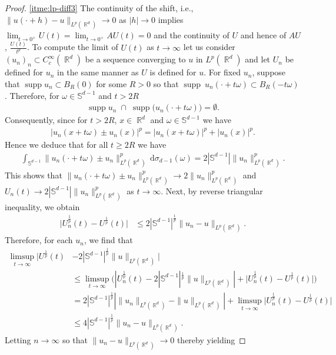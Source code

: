 \documentclass[12pt, reqno]{amsart}%
\theoremstyle{plain}  %
\theoremstyle{definition}  %
\theoremstyle{remark}
\numberwithin{equation}{section}
\DeclareMathOperator{\supp}{supp}
\DeclareMathOperator{\R}{\mathbb{R}}
\renewcommand{\d}{\,\mathrm{d}}
\begin{document}
\begin{proof}
\eqref{itme:lp-diff3} The continuity of the shift, i.e.,  $\|u(\cdot+h)-u\|_{L^p(\R^d)}\to 0$ as $|h|\to0$ implies $\lim_{t \to 0^+} U(t)= \lim_{t \to 0^+} AU(t)=0$ and the continuity of $U$  and hence of $AU$, $\frac{U(t)}{t^p}$. To compute the limit of $U(t)$ as $t\to\infty$ let us consider $(u_n)_n\subset C_c^\infty(\R^d)$  be a sequence converging to $u$ in $L^p(\R^d)$ and let  $U_n$ be defined for $u_n$ in the same manner as $U$ is defined for $u$. For fixed $u_n$, suppose that $\supp u_n \subset B_R(0)$ for some $R>0$ so that $\supp ~u_n(\cdot+t\omega)  \subset B_R(-t\omega)$.
Therefore,  for $\omega \in \mathbb{S}^{d-1}$ and $t>2R$
\begin{align*}
\supp u_n \;\cap\; \supp\big(u_n(\cdot+t\omega)\big) = \emptyset.
\end{align*}
Consequently, since for $t>2R$, $x\in\R^d$  and $\omega\in \mathbb{S}^{d-1}$ we have
\begin{align*}
|u_n(x+t\omega)\pm u_n(x)|^p = |u_n(x+t\omega)|^p + |u_n(x)|^p.
\end{align*}
Hence we deduce that for all $t\geq 2R$ we have
\begin{align*}
\int_{\mathbb{S}^{d-1}}\|u_n(\cdot+t\omega)\pm u_n\|^p_{L^p(\R^d)}\d\sigma_{d-1}(\omega)
= 2|\mathbb{S}^{d-1}| \|u_n\|^p_{L^p(\R^d)}.
\end{align*}
This  shows that  $\|u_n(\cdot+ t\omega)\pm u_n\|^p_{L^p(\R^d)}\to 2\|u_n\|^p_{L^p(\R^d)}$  and $U_n(t)\to 2|\mathbb{S}^{d-1}|\|u_n\|^p_{L^p(\R^d)}$ as $t\to \infty$. Next, by reverse triangular inequality, we obtain
\begin{align*}
\big|U^{\frac{1}{p}}_n(t)-U^{\frac{1}{p}}(t)\big|&\leq 2|\mathbb{S}^{d-1}|^{\frac{1}{p}}\| u_n-u\|_{L^p(\R^d)}.
\end{align*}
Therefore, for each  $u_n$, we find that
\begin{align*}
\limsup_{t\to\infty}|U^{\frac{1}{p}}(t)&- 2|\mathbb{S}^{d-1}|^{\frac{1}{p}}\|u\|_{L^p(\R^d)}|\\
&\leq  \limsup_{t\to\infty}\Big(|U^{\frac{1}{p}}_n(t)- 2|\mathbb{S}^{d-1}|^{\frac{1}{p}}\|u\|_{L^p(\R^d)}|+\big|U^{\frac{1}{p}}_n(t)- U^{\frac{1}{p}}(t)\big|\Big)\\
&=2|\mathbb{S}^{d-1}|^{\frac{1}{p}} | \|u_n\|_{L^p(\R^d)}-\|u\|_{L^p(\R^d)}|+ \limsup_{t\to\infty}\big|U^{\frac{1}{p}}_n(t)- U^{\frac{1}{p}}(t)\big|\\
&\leq 4|\mathbb{S}^{d-1}|^{\frac{1}{p}}\| u_n-u\|_{L^p(\R^d)}.
\end{align*}
Letting $n\to \infty$ so that $\| u_n-u\|_{L^p(\R^d)}\to 0$ thereby yielding

\end{proof}
\end{document}
